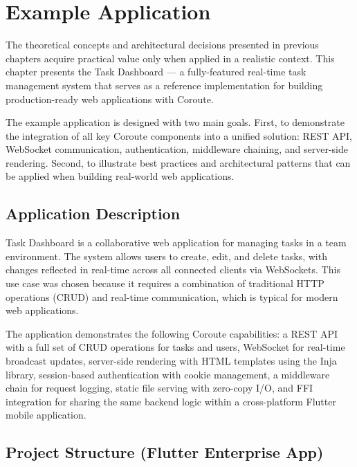 \section{Example Application}
\label{sec:example_app}

The theoretical concepts and architectural decisions presented in previous chapters acquire practical value only when applied in a realistic context. This chapter presents the Task Dashboard --- a fully-featured real-time task management system that serves as a reference implementation for building production-ready web applications with Coroute.

The example application is designed with two main goals. First, to demonstrate the integration of all key Coroute components into a unified solution: REST API, WebSocket communication, authentication, middleware chaining, and server-side rendering. Second, to illustrate best practices and architectural patterns that can be applied when building real-world web applications.

\subsection{Application Description}

Task Dashboard is a collaborative web application for managing tasks in a team environment. The system allows users to create, edit, and delete tasks, with changes reflected in real-time across all connected clients via WebSockets. This use case was chosen because it requires a combination of traditional HTTP operations (CRUD) and real-time communication, which is typical for modern web applications.

The application demonstrates the following Coroute capabilities: a REST API with a full set of CRUD operations for tasks and users, WebSocket for real-time broadcast updates, server-side rendering with HTML templates using the Inja library, session-based authentication with cookie management, a middleware chain for request logging, static file serving with zero-copy I/O, and FFI integration for sharing the same backend logic within a cross-platform Flutter mobile application.

\subsection{Project Structure (Flutter Enterprise App)}

